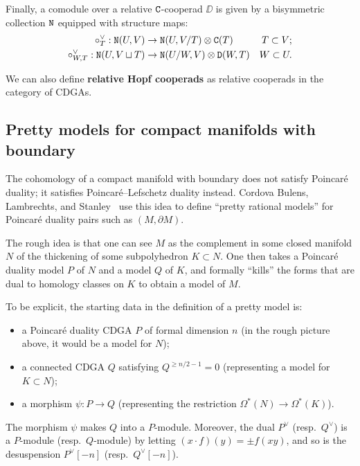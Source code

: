 Finally, a comodule over a relative $\mathtt{C}$-cooperad $\DD$ is given by a bisymmetric collection $\mathtt{N}$ equipped with structure maps:
\begin{align}
  \circ^{\vee}_{T} : \mathtt{N}(U,V)
  & \to \mathtt{N}(U, V/T) \otimes \mathtt{C}(T)
  & T \subset V; \\
  \circ^{\vee}_{W,T} : \mathtt{N}(U, V \sqcup T)
  & \to \mathtt{N}(U/W, V) \otimes \mathtt{D}(W, T)
  & W \subset U.
\end{align}

We can also define \textbf{relative Hopf cooperads} as relative cooperads in the category of CDGAs.

\subsection{Pretty models for compact manifolds with boundary}
\label{cnfbnd.sec.surj-pretty-models}

The cohomology of a compact manifold with boundary does not satisfy Poincaré duality; it satisfies Poincaré--Lefschetz duality instead.
Cordova Bulens, Lambrechts, and Stanley~\cite{CordovaBulensLambrechtsStanley2015,CordovaBulensLambrechtsStanley2015a} use this idea to define ``pretty rational models'' for Poincaré duality pairs such as $(M, \partial M)$.

The rough idea is that one can see $M$ as the complement in some closed manifold $N$ of the thickening of some subpolyhedron $K \subset N$.
One then takes a Poincaré duality model $P$ of $N$ and a model $Q$ of $K$, and formally ``kills'' the forms that are dual to homology classes on $K$ to obtain a model of $M$.

To be explicit, the starting data in the definition of a pretty model is:
\begin{itemize}
\item a Poincaré duality CDGA $P$ of formal dimension $n$ (in the rough picture above, it would be a model for $N$);
\item a connected CDGA $Q$ satisfying $Q^{\ge n/2 - 1} = 0$ (representing a model for $K \subset N$);
\item a morphism $\psi : P \to Q$ (representing the restriction $\Omega^{*}(N) \to \Omega^{*}(K)$).
\end{itemize}

The morphism $\psi$ makes $Q$ into a $P$-module.
Moreover, the dual $P^{\vee}$ (resp.\ $Q^{\vee}$) is a $P$-module (resp.\ $Q$-module) by letting $(x \cdot f)(y) = \pm f(xy)$, and so is the desuspension $P^{\vee}[-n]$ (resp.\ $Q^{\vee}[-n]$).

